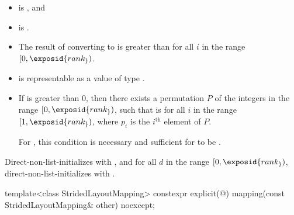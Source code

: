 \begin{itemdescr}
\pnum
\constraints
\begin{itemize}
\item
{} is , and
\item
{} is .
\end{itemize}

\pnum
\expects
\begin{itemize}
\item
The result of converting  to 
is greater than 
for all $i$ in the range $[0, \exposid{rank_})$.
\item
{} is representable
as a value of type .
\item
If  is greater than 0,
then there exists a permutation $P$ of the integers
in the range $[0, \exposid{rank_})$,
such that  is 
for all $i$ in the range $[1, \exposid{rank_})$,
where $p_i$ is the $i^\text{th}$ element of $P$.
\begin{note}
For ,
this condition is necessary and sufficient
for  to be .
\end{note}
\end{itemize}

\pnum
\effects
Direct-non-list-initializes  with , and
for all $d$ in the range $[0, \exposid{rank_})$,
direct-non-list-initializes  with .
\end{itemdescr}

%
\begin{itemdecl}
template<class StridedLayoutMapping>
  constexpr explicit(@\seebelow@)
    mapping(const StridedLayoutMapping& other) noexcept;
\end{itemdecl}

